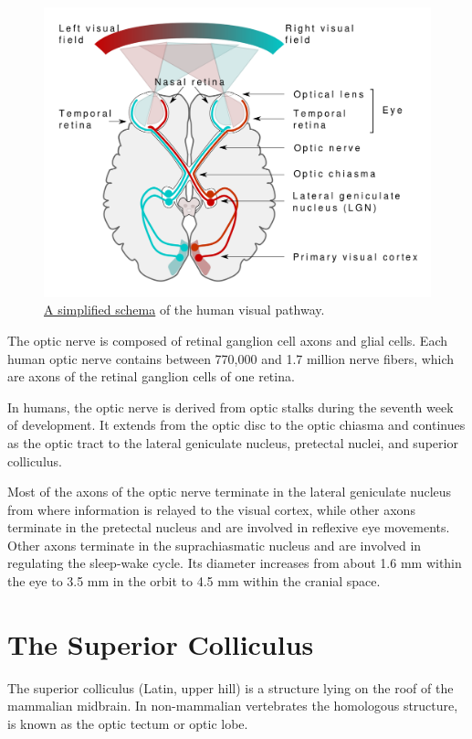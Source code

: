 \begin{figure}

{\centering \includegraphics[width=0.7\linewidth]{./figures/visual/Human_visual_pathway} 

}

\caption{\href{https://commons.m.wikimedia.org/wiki/File:Human_visual_pathway.svg}{A simplified schema} of the human visual pathway.}\label{fig:visualpathways}
\end{figure}

The optic nerve is composed of retinal ganglion cell axons and glial cells. Each human optic nerve contains between 770,000 and 1.7 million nerve fibers, which are axons of the retinal ganglion cells of one retina.

In humans, the optic nerve is derived from optic stalks during the seventh week of development. It extends from the optic disc to the optic chiasma and continues as the optic tract to the lateral geniculate nucleus, pretectal nuclei, and superior colliculus.

Most of the axons of the optic nerve terminate in the lateral geniculate nucleus from where information is relayed to the visual cortex, while other axons terminate in the pretectal nucleus and are involved in reflexive eye movements. Other axons terminate in the suprachiasmatic nucleus and are involved in regulating the sleep-wake cycle. Its diameter increases from about 1.6 mm within the eye to 3.5 mm in the orbit to 4.5 mm within the cranial space.

\hypertarget{the-superior-colliculus}{%
\section{The Superior Colliculus}\label{the-superior-colliculus}}

The superior colliculus (Latin, upper hill) is a structure lying on the roof of the mammalian midbrain. In non-mammalian vertebrates the homologous structure, is known as the optic tectum or optic lobe.

